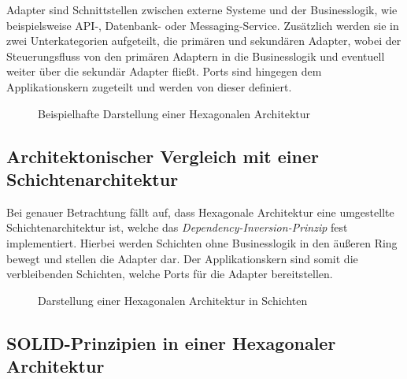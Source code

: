 \documentclass[conference]{IEEEtran}
\begin{document}

Adapter sind Schnittstellen zwischen externe Systeme und der Businesslogik, wie beispielsweise API-, Datenbank- oder Messaging-Service.  Zusätzlich werden sie in zwei Unterkategorien aufgeteilt, die primären und sekundären Adapter, wobei der Steuerungsfluss von den primären Adaptern in die Businesslogik und eventuell weiter über die sekundär Adapter fließt. Ports sind hingegen dem Applikationskern zugeteilt und werden von dieser definiert.


\begin{figure}[htbp]
	\small
	
	\caption{Beispielhafte Darstellung einer Hexagonalen Architektur}
	\label{HexagonaleArchitektur}
\end{figure}


\subsection{Architektonischer Vergleich mit einer Schichtenarchitektur}

Bei genauer Betrachtung fällt auf, dass Hexagonale Architektur eine umgestellte Schichtenarchitektur ist, welche das \emph{Dependency-Inversion-Prinzip} fest implementiert. Hierbei werden Schichten ohne Businesslogik in den äußeren Ring bewegt und stellen die Adapter dar. Der Applikationskern sind somit die verbleibenden Schichten, welche Ports für die Adapter bereitstellen.


\begin{figure}[htbp]
	
	\caption{Darstellung einer Hexagonalen Architektur in Schichten}
	\label{HexagonaleInSchichtenarchitektur}
\end{figure}



\subsection{SOLID-Prinzipien in einer Hexagonaler Architektur}
 
\end{document}
